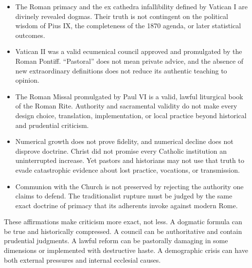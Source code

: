 \begin{itemize}
\item The Roman primacy and the ex cathedra infallibility defined by Vatican I are divinely revealed dogmas. Their truth is not contingent on the political wisdom of Pius IX, the completeness of the 1870 agenda, or later statistical outcomes.
\item Vatican II was a valid ecumenical council approved and promulgated by the Roman Pontiff. “Pastoral” does not mean private advice, and the absence of new extraordinary definitions does not reduce its authentic teaching to opinion.
\item The Roman Missal promulgated by Paul VI is a valid, lawful liturgical book of the Roman Rite. Authority and sacramental validity do not make every design choice, translation, implementation, or local practice beyond historical and prudential criticism.
\item Numerical growth does not prove fidelity, and numerical decline does not disprove doctrine. Christ did not promise every Catholic institution an uninterrupted increase. Yet pastors and historians may not use that truth to evade catastrophic evidence about lost practice, vocations, or transmission.
\item Communion with the Church is not preserved by rejecting the authority one claims to defend. The traditionalist rupture must be judged by the same exact doctrine of primacy that its adherents invoke against modern Rome.
\end{itemize}

These affirmations make criticism more exact, not less. A dogmatic formula can be true and historically compressed. A council can be authoritative and contain prudential judgments. A lawful reform can be pastorally damaging in some dimensions or implemented with destructive haste. A demographic crisis can have both external pressures and internal ecclesial causes.

